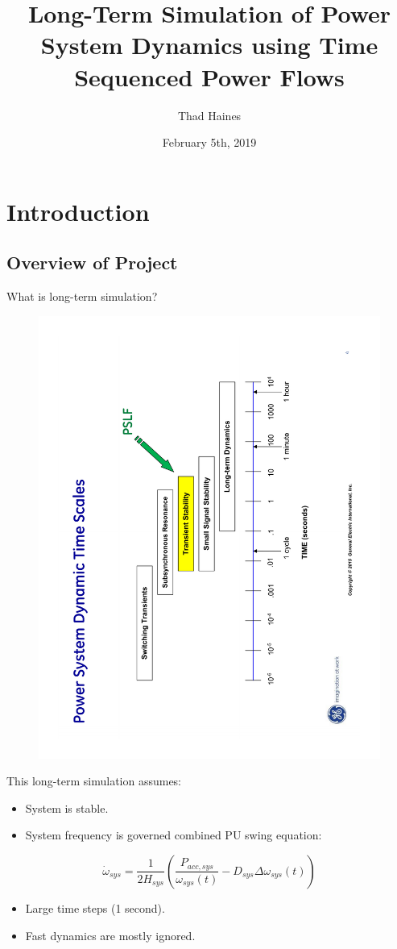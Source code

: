 \documentclass[14pt, unknownkeysallowed]{beamer}
\title{Long-Term Simulation of Power System Dynamics using Time Sequenced Power Flows}
\author{Thad Haines}
\institute[MT TECH]{Montana Tech - Master's Thesis Research Project}
\date{February 5th, 2019}
\begin{document}
\begin{frame}
\titlepage
\end{frame}

\section{Introduction}
\subsection{Overview of Project}
\begin{frame}
What is long-term simulation?
\begin{figure}
	\vspace{-1em}
	\includegraphics[angle=-90,origin=c,width=.9\linewidth]{GEtimeScales}
\end{figure}
\end{frame}
\begin{frame}
This long-term simulation assumes:
\begin{itemize}
	\item System is stable.
	\item System frequency is governed combined PU swing equation:
\end{itemize}
	\[ \dot{\omega}_{sys} = \dfrac{1}{2H_{sys} } \left( \dfrac{P_{acc, sys} }{\omega_{sys}(t)} - D_{sys}\Delta\omega_{sys}(t)  \right)  \]
	\begin{itemize}
		\item Large time steps (1 second).
		\item Fast dynamics are mostly ignored.
	\end{itemize}
\end{frame}
\end{document}

